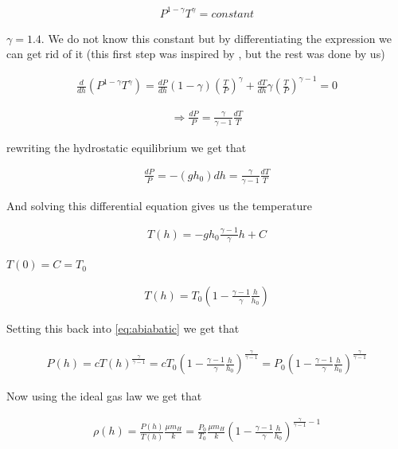 \documentclass[a4paper, 10pt]{article}
\begin{document}
\begin{align}\label{eq:abiabatic}
P^{1-\gamma}T^{\gamma} = constant
\end{align}

$\gamma = 1.4$. We do not know this constant but by differentiating the expression we can get rid of it (this first step was inspired by \cite{adia}, but the rest was done by us)

\begin{align}
\frac{d}{dh}(P^{1-\gamma}T^{\gamma}) = \frac{dP}{dh}(1-\gamma)\left(\frac{T}{P} \right)^{\gamma} + \frac{dT}{dh}\gamma \left(\frac{T}{P} \right)^{\gamma-1} = 0
\end{align}

\begin{align}
\Rightarrow \frac{dP}{P} = \frac{\gamma}{\gamma - 1}\frac{dT}{T}
\end{align}

rewriting the hydrostatic equilibrium we get that

\begin{align}
\frac{dP}{P} = -(g h_0) dh = \frac{\gamma}{\gamma - 1}\frac{dT}{T}
\end{align}

And solving this differential equation gives us the temperature

\begin{align}
T(h) = -g h_0 \frac{\gamma-1}{\gamma}h + C
\end{align}

$T(0) = C = T_0$

\begin{align}\label{eq:adiatemp}
T(h) = T_0 \left( 1 -\frac{\gamma - 1}{\gamma} \frac{h}{h_0} \right)
\end{align}

Setting this back into \ref{eq:abiabatic} we get that

\begin{align}
P(h) = cT(h)^{\frac{\gamma}{\gamma-1}} = cT_0 \left( 1 -\frac{\gamma - 1}{\gamma} \frac{h}{h_0} \right)^{\frac{\gamma}{\gamma-1}} = P_0\left( 1 -\frac{\gamma - 1}{\gamma} \frac{h}{h_0} \right)^{\frac{\gamma}{\gamma-1}}
\end{align}

Now using the ideal gas law we get that

\begin{align}
\rho (h) = \frac{P(h)}{T(h)}\frac{\mu m_H}{k} = \frac{P_0}{T_0}\frac{\mu m_H}{k}\left( 1 -\frac{\gamma - 1}{\gamma} \frac{h}{h_0} \right)^{\frac{\gamma}{\gamma-1} - 1}
\end{align}
\end{document}
